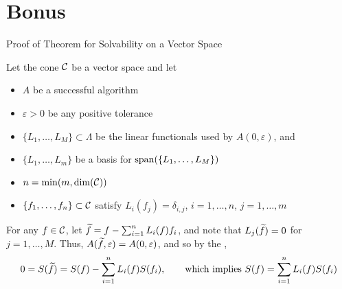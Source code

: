 \documentclass[11pt,compress,xcolor={usenames,dvipsnames},aspectratio=169]{beamer}
\begin{document}


\thankyouframe

\printbibliography

\section{Bonus}
\begin{frame}[label = VectorSpaceThmProof]{Proof of Theorem for Solvability on a Vector Space}

\vspace{-3ex}

Let the cone $\mathcal{C}$ be a \alert{vector space} and let

\vspace{-3ex}
\begin{itemize}
    \item $A$ be a successful algorithm
    
    \item $\varepsilon > 0$ be any positive tolerance
    
    \item  $\{L_1, \ldots, L_{M}\} \subset \Lambda$ be the linear functionals used by $A(0,\varepsilon)$, and
    
    \item  $\{L_1, \ldots, L_m\}$ be a basis for $\operatorname{span}(\{L_1, \ldots, L_{M}\})$
    
    \item $n  = \min(m,\dim(\mathcal{C}))$
    
        \item $\{f_1, \ldots, f_n\} \subset \mathcal{C}$ satisfy $L_i(f_j) = \delta_{i,j}$, $i =1, \ldots, n$, $j=1, \ldots, m$
\end{itemize}

\vspace{-2ex}

For any $f \in \mathcal{C}$, let $\widetilde{f} = f- \sum_{i=1}^n L_i(f) f_i$, and note that $L_j(\widetilde{f}) = 0$ for $j =1, \ldots, M$.  Thus, $A(\widetilde{f},\varepsilon) = A(0,\varepsilon)$, and so by the \hyperlink{ZeroCorollary}{},
\[
0 = S(\widetilde{f}) = S(f) - \sum_{i=1}^n L_i(f) S(f_i), \qquad \text{which implies } S(f) = \sum_{i=1}^n L_i(f) S(f_i)
\]

\vspace{-3ex}
    \hyperlink{VectorSpaceThm}{}
\end{frame}
\end{document}
